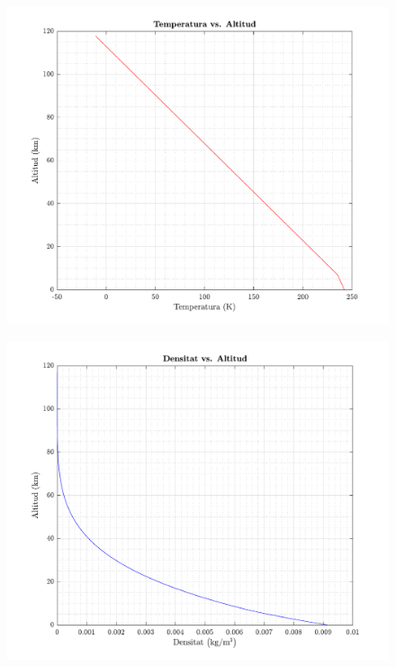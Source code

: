 \begin{figure}[ht]
    \centering
    \begin{minipage}{.5\textwidth}
        \centering
        \includegraphics[width=1\linewidth]{imagenes/11_mars/temperatura.pdf}
        \label{fig:11mars}
    \end{minipage}%
        \begin{minipage}{.5\textwidth}
        \centering
        \includegraphics[width=1\linewidth]{imagenes/11_mars/densidad.pdf}

\end{minipage}
\end{figure}
